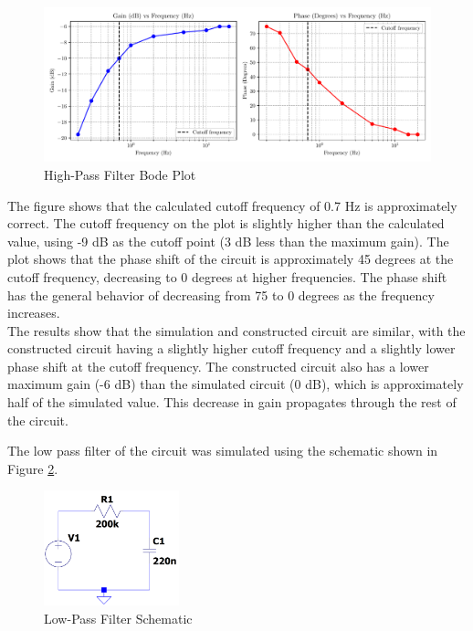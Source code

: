 \documentclass[CMPE]{KGCOEReport}
\begin{document}
\begin{figure}[H]
    \centering
    \includegraphics[width=1\textwidth]{high_pass_plot.pdf}
    \caption{High-Pass Filter Bode Plot}
    \label{fig:highPassBode}
\end{figure}

The figure shows that the calculated cutoff frequency of 0.7 Hz is approximately correct. The cutoff frequency on the plot is slightly higher than the calculated value, using -9 dB as the cutoff point (3 dB less than the maximum gain). The plot shows that the phase shift of the circuit is approximately 45 degrees at the cutoff frequency, decreasing to 0 degrees at higher frequencies. The phase shift has the general behavior of decreasing from 75 to 0 degrees as the frequency increases.\\

The results show that the simulation and constructed circuit are similar, with the constructed circuit having a slightly higher cutoff frequency and a slightly lower phase shift at the cutoff frequency. The constructed circuit also has a lower maximum gain (-6 dB) than the simulated circuit (0 dB), which is approximately half of the simulated value. This decrease in gain propagates through the rest of the circuit.

\bigskip

The low pass filter of the circuit was simulated using the schematic shown in Figure \ref{fig:ltspiceLowPassSchematic}.

\begin{figure}[H]
    \centering
    \includegraphics[width=0.35\textwidth]{LowPass.png}
    \caption{Low-Pass Filter Schematic}
    \label{fig:ltspiceLowPassSchematic}
\end{figure}
\end{document}
